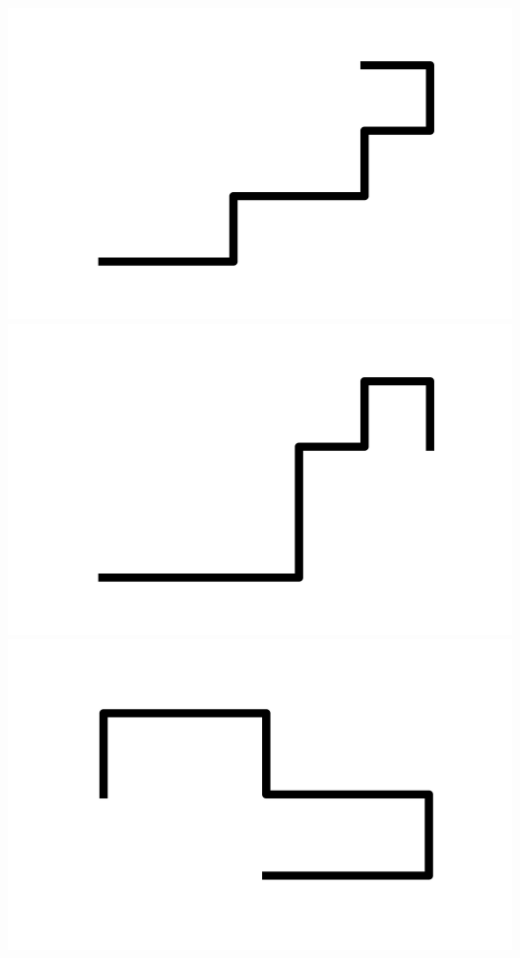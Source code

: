 \documentclass[]{report}
\begin{document}
\includegraphics[scale=.1]{pictures/21/state_cluster_shapes_457.pdf} 
\includegraphics[scale=.1]{pictures/21/state_cluster_shapes_458.pdf} 
\includegraphics[scale=.1]{pictures/21/state_cluster_shapes_459.pdf} 
\end{document}
